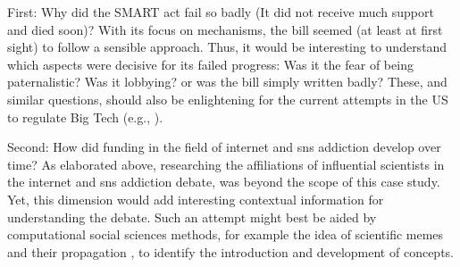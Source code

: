 First: Why did the SMART act fail so badly (It did not receive much support and died soon)? 
With its focus on mechanisms, the bill seemed (at least at first sight) to follow a sensible approach.
Thus, it would be interesting to understand which aspects were decisive for its failed progress: Was it the fear of being  paternalistic? Was it lobbying? or was the bill simply written badly?
These, and similar questions, should also be enlightening for the current attempts in the US to regulate Big Tech (e.g., \citep{govtrackus_bust_2021}).

Second: How did funding in the field of internet and \gls{sns} addiction develop over time?
As elaborated above, researching the affiliations of influential scientists in the internet and \gls{sns} addiction debate, was beyond the scope of this case study. 
Yet, this dimension would add interesting contextual information for understanding the debate. 
Such an attempt might best be aided by computational social sciences methods, for example the idea of scientific memes and their propagation \citep{kuhn_inheritance_2014}, to identify the introduction and development of concepts. 